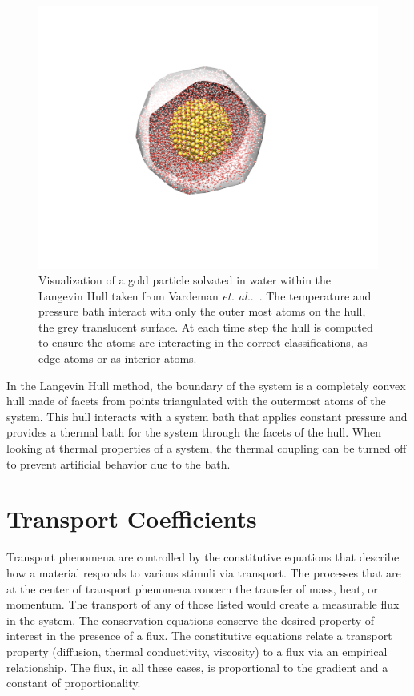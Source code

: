 \begin{figure}
    \centering
    \includegraphics[scale=1]{figures/hull.pdf}
    \caption{Visualization of a gold particle solvated in water within the Langevin Hull taken from Vardeman \textit{et. al.}.~\cite{Vardeman2011}. The temperature and pressure bath interact with only the outer most atoms on the hull, the grey translucent surface. At each time step the hull is computed to ensure the atoms are interacting in the correct classifications, as edge atoms or as interior atoms.}
    \label{fig:hull}
\end{figure}

In the Langevin Hull method, the boundary of the system is a completely convex hull made of facets from points triangulated with the outermost atoms of the system. This hull interacts with a system bath that applies constant pressure and provides a thermal bath for the system through the facets of the hull. When looking at thermal properties of a system, the thermal coupling can be turned off to prevent artificial behavior due to the bath.

\section{Transport Coefficients}
Transport phenomena are controlled by the constitutive equations that describe how a material responds to various stimuli via transport.
The processes that are at the center of transport phenomena concern the transfer of mass, heat, or momentum. The transport of any of those listed would create a measurable flux in the system. The conservation equations conserve the desired property of interest in the presence of a flux.
The constitutive equations relate a transport property (diffusion, thermal conductivity, viscosity) to a flux via an empirical relationship. The flux, in all these cases, is proportional to the gradient and a constant of proportionality.

